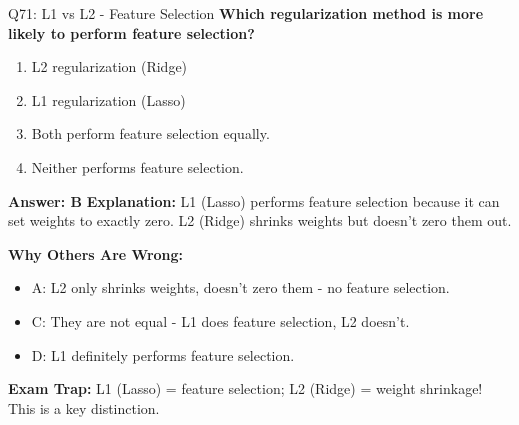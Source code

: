 \documentclass[8pt]{beamer}
\begin{document}
	\begin{frame}{Q71: L1 vs L2 - Feature Selection}
		\fontsize{6.5}{7.5}\selectfont
		\textbf{Which regularization method is more likely to perform feature selection?}
		
		\begin{enumerate}
			\item L2 regularization (Ridge)
			\item L1 regularization (Lasso)
			\item Both perform feature selection equally.
			\item Neither performs feature selection.
		\end{enumerate}
		
		\vspace{0.05cm}
		\textcolor{myblue}{\textbf{Answer: B}}
		\vspace{0.05cm}
		\textcolor{myblue}{\textbf{Explanation:}} L1 (Lasso) performs feature selection because it can set weights to exactly zero. L2 (Ridge) shrinks weights but doesn't zero them out.
		
		\vspace{0.05cm}
		\textcolor{myred}{\textbf{Why Others Are Wrong:}}
		\begin{itemize}
			\item \textcolor{myred}{A:} L2 only shrinks weights, doesn't zero them - no feature selection.
			\item \textcolor{myred}{C:} They are not equal - L1 does feature selection, L2 doesn't.
			\item \textcolor{myred}{D:} L1 definitely performs feature selection.
		\end{itemize}
		
		\textcolor{myred}{\textbf{Exam Trap:}} L1 (Lasso) = \textcolor{myblue}{feature selection}; L2 (Ridge) = \textcolor{myblue}{weight shrinkage}! This is a key distinction.
	\end{frame}
	
\end{document}
